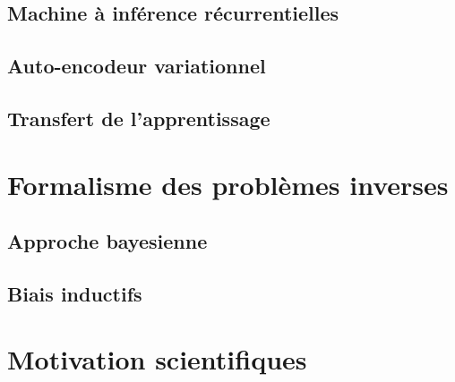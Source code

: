 \subsection{Machine à inférence récurrentielles}

\subsection{Auto-encodeur variationnel}

\subsection{Transfert de l'apprentissage}


\section{Formalisme des problèmes inverses}\label{sec:formalisme probleme inverse}

\subsection{Approche bayesienne}

\subsection{Biais inductifs}

\subsection{}


\section{Motivation scientifiques}\label{sec:motivations}



